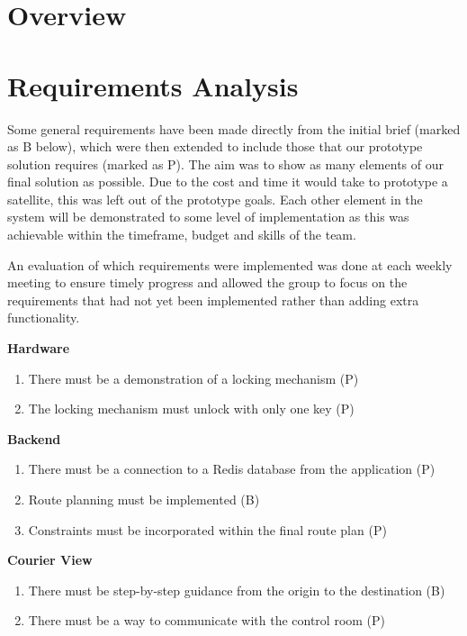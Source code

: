 

\section{Overview}

\section{Requirements Analysis}

Some general requirements have been made directly from the initial brief (marked as B below), which were then extended to include those that our prototype solution requires (marked as P). The aim was to show as many elements of our final solution as possible. Due to the cost and time it would take to prototype a satellite, this was left out of the prototype goals. Each other element in the system will be demonstrated to some level of implementation as this was achievable within the timeframe, budget and skills of the team. 

An evaluation of which requirements were implemented was done at each weekly meeting to ensure timely progress and allowed the group to focus on the requirements that had not yet been implemented rather than adding extra functionality. 
    
\textbf{Hardware}
\begin{enumerate}
\item There must be a demonstration of a locking mechanism (P)
\item The locking mechanism must unlock with only one key (P)
\end{enumerate}

\textbf{Backend}
\begin{enumerate}[resume]
\item There must be a connection to a Redis database from the application (P)
\item Route planning must be implemented (B)
\item Constraints must be incorporated within the final route plan (P)
\end{enumerate}

\textbf{Courier View}
\begin{enumerate}[resume]
\item There must be step-by-step guidance from the origin to the destination (B)
\item There must be a way to communicate with the control room (P)
\end{enumerate}


